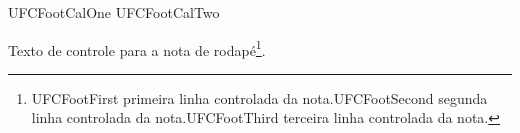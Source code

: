 \documentclass{abntexto-ufc}
\begin{document}
\textual

\noindent
{\abntsmall\singlesp
UFCFootCalOne\linebreak
UFCFootCalTwo
\par}

\vspace{2\baselineskip}

\noindent
Texto de controle para a nota de rodapé\footnote{UFCFootFirst primeira linha controlada da nota.\linebreak UFCFootSecond segunda linha controlada da nota.\linebreak UFCFootThird terceira linha controlada da nota.}.
\end{document}

